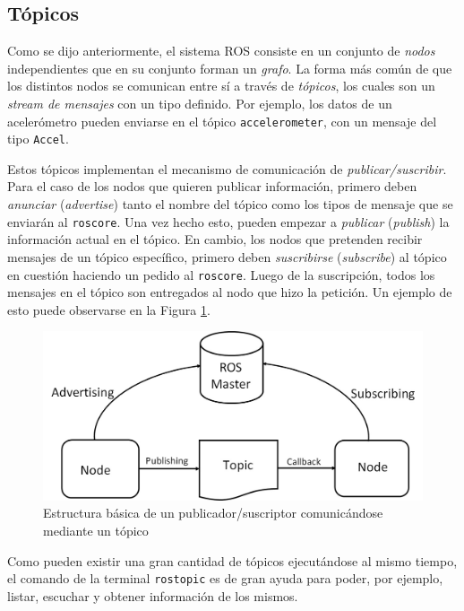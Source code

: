 \subsection{Tópicos}
Como se dijo anteriormente, el sistema ROS consiste en un conjunto de \textit{nodos} independientes que en su conjunto forman un \textit{grafo}. La forma más común de que los distintos nodos se comunican entre sí a través de \textit{tópicos}, los cuales son un \textit{stream de mensajes} con un tipo definido. Por ejemplo, los datos de un acelerómetro pueden enviarse en el tópico \texttt{accelerometer}, con un mensaje del tipo \texttt{Accel}. 

Estos tópicos implementan el mecanismo de comunicación de \textit{publicar/suscribir}. Para el caso de los nodos que quieren publicar información, primero deben \textit{anunciar} (\textit{advertise}) tanto el nombre del tópico como los tipos de mensaje que se enviarán al \texttt{roscore}. Una vez hecho esto, pueden empezar a \textit{publicar} (\textit{publish}) la información actual en el tópico. En cambio, los nodos que pretenden recibir mensajes de un tópico específico, primero deben \textit{suscribirse} (\textit{subscribe}) al tópico en cuestión haciendo un pedido al \texttt{roscore}. Luego de la suscripción, todos los mensajes en el tópico son entregados al nodo que hizo la petición. Un ejemplo de esto puede observarse en la Figura \ref{fig:rostopics}.
\begin{figure}
    \centering
    \includegraphics[width=\textwidth]{Img/ROSTopics.jpg}
    \caption{Estructura básica de un publicador/suscriptor comunicándose mediante un tópico}
    \label{fig:rostopics}
\end{figure}

Como pueden existir una gran cantidad de tópicos ejecutándose al mismo tiempo, el comando de la terminal \texttt{rostopic} es de gran ayuda para poder, por ejemplo, listar, escuchar y obtener información de los mismos.

